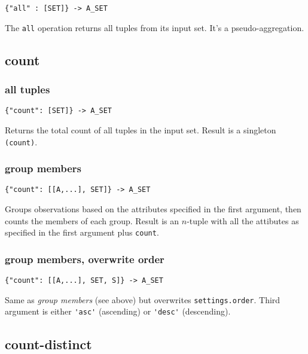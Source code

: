 \documentclass[a4paper]{article}
\begin{document}
\begin{verbatim}
{"all" : [SET]} -> A_SET
\end{verbatim}

The \verb|all| operation returns all tuples from its input set. It's a pseudo-aggregation.

\subsection{count}

\subsubsection{all tuples}

\begin{verbatim}
{"count": [SET]} -> A_SET
\end{verbatim}

Returns the total count of all tuples in the input set. Result is a
singleton \verb|(count)|.

\subsubsection{group members}

\begin{verbatim}
{"count": [[A,...], SET]} -> A_SET
\end{verbatim}

Groups observations based on the attributes specified in the first
argument, then counts the members of each group.  Result is an
$n$-tuple with all the attibutes as specified in the first argument
plus \verb|count|.

\subsubsection{group members, overwrite order}

\begin{verbatim}
{"count": [[A,...], SET, S]} -> A_SET
\end{verbatim}

Same as \textit{group members} (see above) but overwrites \verb|settings.order|. Third argument is either \verb|'asc'| (ascending)
or \verb|'desc'| (descending).

\subsection{count-distinct}
\end{document}

